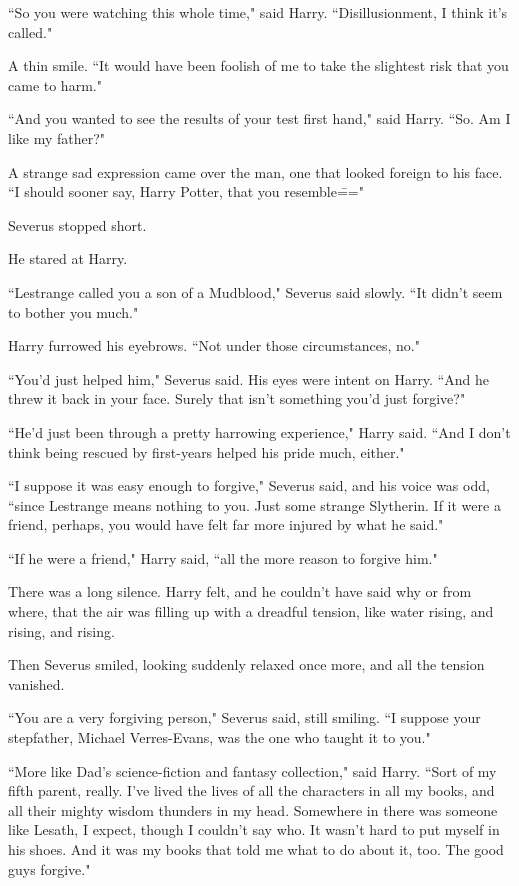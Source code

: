 ``So you were watching this whole time," said Harry. ``Disillusionment, I think it's called."

A thin smile. ``It would have been foolish of me to take the slightest risk that you came to harm."

``And you wanted to see the results of your test first hand," said Harry. ``So. Am I like my father?"

A strange sad expression came over the man, one that looked foreign to his face. ``I should sooner say, Harry Potter, that you resemble\==="

Severus stopped short.

He stared at Harry.

``Lestrange called you a son of a Mudblood," Severus said slowly. ``It didn't seem to bother you much."

Harry furrowed his eyebrows. ``Not under those circumstances, no."

``You'd just helped him," Severus said. His eyes were intent on Harry. ``And he threw it back in your face. Surely that isn't something you'd just forgive?"

``He'd just been through a pretty harrowing experience," Harry said. ``And I don't think being rescued by first-years helped his pride much, either."

``I suppose it was easy enough to forgive," Severus said, and his voice was odd, ``since Lestrange means nothing to you. Just some strange Slytherin. If it were a friend, perhaps, you would have felt far more injured by what he said."

``If he were a friend," Harry said, ``all the more reason to forgive him."

There was a long silence. Harry felt, and he couldn't have said why or from where, that the air was filling up with a dreadful tension, like water rising, and rising, and rising.

Then Severus smiled, looking suddenly relaxed once more, and all the tension vanished.

``You are a very forgiving person," Severus said, still smiling. ``I suppose your stepfather, Michael Verres-Evans, was the one who taught it to you."

``More like Dad's science-fiction and fantasy collection," said Harry. ``Sort of my fifth parent, really. I've lived the lives of all the characters in all my books, and all their mighty wisdom thunders in my head. Somewhere in there was someone like Lesath, I expect, though I couldn't say who. It wasn't hard to put myself in his shoes. And it was my books that told me what to do about it, too. The good guys forgive."

